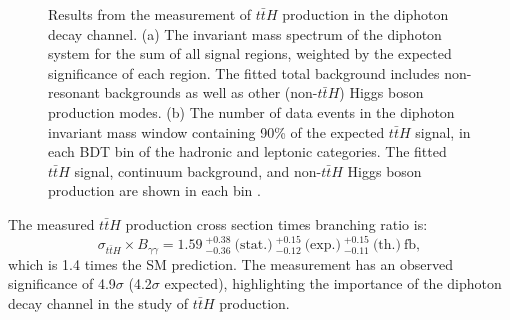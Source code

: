 \documentclass{moriond}
\def\tth{\ensuremath{t\bar{t}H}\xspace}
\begin{document}
\begin{figure}[!htbp]
  \centering
  \caption{
    Results from the measurement of \tth production in the diphoton decay channel.
    (a) The invariant mass spectrum of the diphoton system for the sum of all signal regions, weighted
    by the expected significance of each region. The fitted total background includes non-resonant
    backgrounds as well as other (non-\tth) Higgs boson production modes.
    (b) The number of data events in the diphoton invariant mass window containing 90\% of the expected
    \tth signal, in each BDT bin of the hadronic and leptonic categories.
    The fitted \tth signal, continuum background, and non-\tth Higgs boson production are shown in each bin \cite{ATLAS-CONF-2019-004}.
  }
  \label{fig:tth}
\end{figure}

The measured \tth production cross section times branching ratio
is:
%
\begin{equation}
\sigma_{\tth} \times B_{\gamma\gamma} = 1.59~^{+0.38}_{-0.36} ~\textrm{(stat.)}
~^{+0.15}_{-0.12} ~\textrm{(exp.)}
~^{+0.15}_{-0.11} ~\textrm{(th.)}~\textrm{fb},
\end{equation}
%
which is 1.4 times the SM prediction.
The measurement has an observed significance of 4.9$\sigma$ (4.2$\sigma$ expected),
highlighting the importance of the diphoton decay channel in the study of \tth production.
\end{document}
